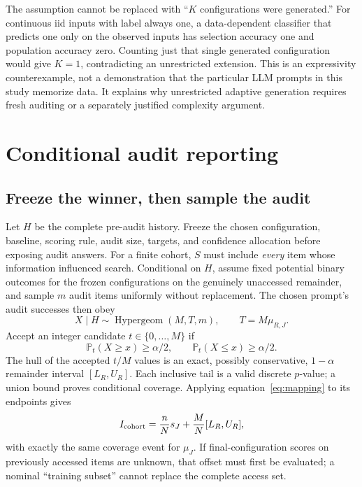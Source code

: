 \documentclass{article}
\newcommand{\Prob}{\mathbb P}
\begin{document}
The assumption cannot be replaced with ``$K$ configurations were generated.'' For continuous iid inputs with label always one, a data-dependent classifier that predicts one only on the observed inputs has selection accuracy one and population accuracy zero. Counting just that single generated configuration would give $K=1$, contradicting an unrestricted extension. This is an expressivity counterexample, not a demonstration that the particular LLM prompts in this study memorize data. It explains why unrestricted adaptive generation requires fresh auditing or a separately justified complexity argument.

\section{Conditional audit reporting}
\subsection{Freeze the winner, then sample the audit}
Let $H$ be the complete pre-audit history. Freeze the chosen configuration, baseline, scoring rule, audit size, targets, and confidence allocation before exposing audit answers. For a finite cohort, $S$ must include \emph{every} item whose information influenced search. Conditional on $H$, assume fixed potential binary outcomes for the frozen configurations on the genuinely unaccessed remainder, and sample $m$ audit items uniformly without replacement. The chosen prompt's audit successes then obey
\[
 X\mid H\sim\operatorname{Hypergeom}(M,T,m),\qquad T=M\mu_{R,J}.
\]
Accept an integer candidate $t\in\{0,\ldots,M\}$ if
\begin{equation}
 \Prob_t(X\geq x)\geq\alpha/2,\qquad
 \Prob_t(X\leq x)\geq\alpha/2.\label{eq:inversion}
\end{equation}
The hull of the accepted $t/M$ values is an exact, possibly conservative, $1-\alpha$ remainder interval $[L_R,U_R]$. Each inclusive tail is a valid discrete $p$-value; a union bound proves conditional coverage. Applying equation~\eqref{eq:mapping} to its endpoints gives
\begin{equation}
 I_{\rm cohort}=\frac nN s_J+\frac MN[L_R,U_R],\label{eq:poolci}
\end{equation}
with exactly the same coverage event for $\mu_J$. If final-configuration scores on previously accessed items are unknown, that offset must first be evaluated; a nominal ``training subset'' cannot replace the complete access set.
\end{document}
